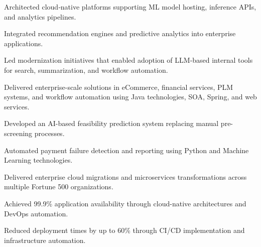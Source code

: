 \documentclass[letterpaper]{deedy-resume} %
\begin{document}
\begin{minipage}[t]{0.66\textwidth}
\sectionspace

\begin{tightitemize}

\item Architected cloud‑native platforms supporting ML model hosting, inference APIs, and analytics pipelines.

\item Integrated recommendation engines and predictive analytics into enterprise applications.

\item Led modernization initiatives that enabled adoption of LLM‑based internal tools for search, summarization, and workflow automation.

\end{tightitemize}

\sectionspace

\begin{tightitemize}
\item Delivered enterprise-scale solutions in eCommerce, financial services, PLM systems, and workflow automation using Java technologies, SOA, Spring, and web services.
\end{tightitemize}

\begin{tightitemize}
\item Developed an AI-based feasibility prediction system replacing manual pre-screening processes.
\item Automated payment failure detection and reporting using Python and Machine Learning technologies.
\item Delivered enterprise cloud migrations and microservices transformations across multiple Fortune 500 organizations.
\item Achieved 99.9\% application availability through cloud-native architectures and DevOps automation.
\item Reduced deployment times by up to 60\% through CI/CD implementation and infrastructure automation.
\end{tightitemize}



\sectionspace %


\end{minipage}
\end{document}
